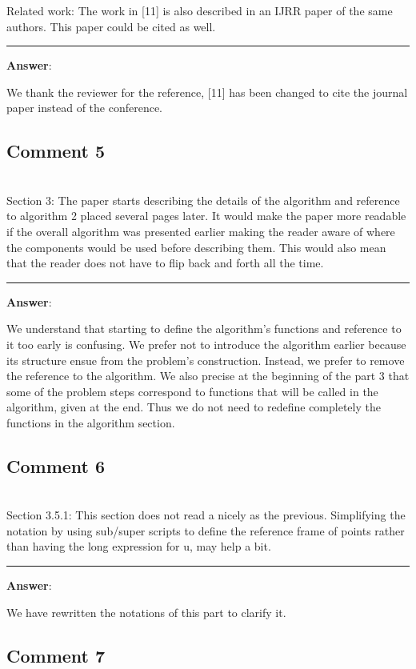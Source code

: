 \documentclass{scrartcl}
\begin{document}
Related work: 
The work in [11] is also described in an IJRR paper of the same authors. This paper could be cited as well.

\rule{\linewidth}{.1pt}
\textbf{Answer}:

We thank the reviewer for the reference, [11] has been changed to cite the journal paper instead of the conference.

\subsection{Comment 5}
\hrulefill\\

Section 3:
The paper starts describing the details of the algorithm and reference to algorithm 2 placed several pages later. It would make the paper more readable if the overall algorithm was presented earlier making the reader aware of where the components would be used before describing them. This would also mean that the reader does not have to flip back and forth all the time.

\rule{\linewidth}{.1pt}
\textbf{Answer}:

We understand that starting to define the algorithm's functions and reference 
to it too early is confusing.
We prefer not to introduce the algorithm earlier because its structure ensue 
from the problem's construction.
Instead, we prefer to remove the reference to the algorithm. We also precise at 
the beginning of the part 3 that some of the problem steps correspond to 
functions that will be called in the algorithm, given at the end. Thus we do not need to redefine completely the functions in the algorithm section.

\subsection{Comment 6}
\hrulefill\\

Section 3.5.1:
This section does not read a nicely as the previous. Simplifying the notation by using sub/super scripts to define the reference frame of points rather than having the long expression for u, may help a bit.

\rule{\linewidth}{.1pt}
\textbf{Answer}:

We have rewritten the notations of this part to clarify it.

\subsection{Comment 7}
\hrulefill\\
\end{document}

